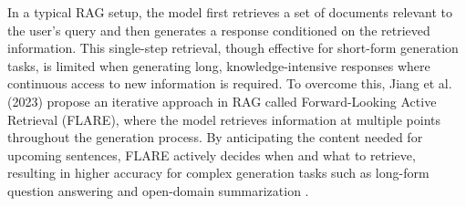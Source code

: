 In a typical RAG setup, the model first retrieves a set of documents relevant to the user’s query and then generates a response conditioned on the retrieved information. This single-step retrieval, though effective for short-form generation tasks, is limited when generating long, knowledge-intensive responses where continuous access to new information is required. To overcome this, Jiang et al. (2023) propose an iterative approach in RAG called Forward-Looking Active Retrieval (FLARE), where the model retrieves information at multiple points throughout the generation process. By anticipating the content needed for upcoming sentences, FLARE actively decides when and what to retrieve, resulting in higher accuracy for complex generation tasks such as long-form question answering and open-domain summarization \cite{23}.
